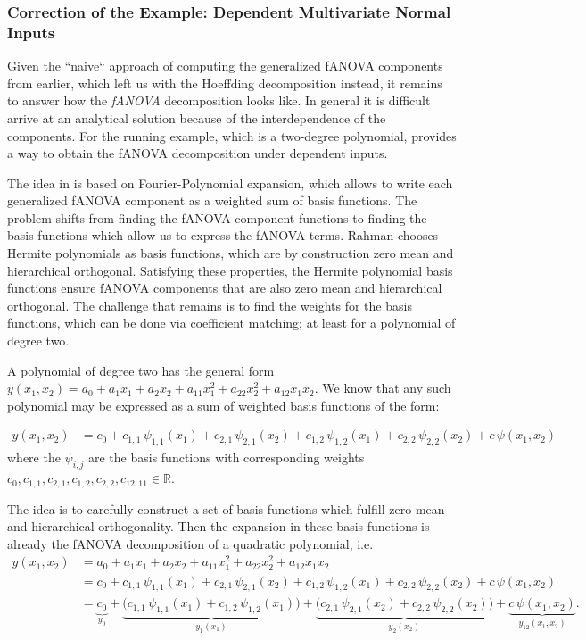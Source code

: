 \subsubsection{Correction of the Example: Dependent Multivariate Normal Inputs}
Given the ``naive`` approach of computing the generalized fANOVA components from earlier, which left us with the Hoeffding decomposition instead, it remains to answer how the \textit{fANOVA} decomposition looks like.
In general it is difficult arrive at an analytical solution because of the interdependence of the components. For the running example, which is a two-degree polynomial, \cite{rahman2014} provides a way to obtain the fANOVA decomposition under dependent inputs.\par

The idea in \cite{rahman2014} is based on Fourier-Polynomial expansion, which allows to write each generalized fANOVA component as a weighted sum of basis functions. 
The problem shifts from finding the fANOVA component functions to finding the basis functions which allow us to express the fANOVA terms.
Rahman chooses Hermite polynomials as basis functions, which are by construction zero mean and hierarchical orthogonal. Satisfying these properties, the Hermite polynomial basis functions ensure fANOVA components that are also zero mean and hierarchical orthogonal.
The challenge that remains is to find the weights for the basis functions, which can be done via coefficient matching; at least for a polynomial of degree two.

A polynomial of degree two has the general form $y(x_1,x_2) = a_0 + a_1 x_1 + a_2 x_2 + a_{11} x_1^2 + a_{22} x_2^2 + a_{12} x_1 x_2$.
We know that any such polynomial may be expressed as a sum of weighted basis functions \cite{nagler2024linalg} of the form:

\begin{align*}
y(x_1,x_2) 
&= c_0 
  + c_{1,1}\,\psi_{1,1}(x_1) 
  + c_{2,1}\,\psi_{2,1}(x_2)
  + c_{1,2}\,\psi_{1,2}(x_1)
  + c_{2,2}\,\psi_{2,2}(x_2)
  + c\,\psi(x_1,x_2)
\end{align*}
where the $\psi_{i,j}$ are the basis functions with corresponding weights $c_0, c_{1,1}, c_{2,1}, c_{1,2}, c_{2,2}, c_{12, 11} \in \mathbb{R}$.

The idea is to carefully construct a set of basis functions which fulfill zero mean 
and hierarchical orthogonality. Then the expansion in these basis functions is already the 
fANOVA decomposition of a quadratic polynomial, i.e.
\begin{align*}
y(x_1,x_2) 
&= a_0 + a_1 x_1 + a_2 x_2 + a_{11} x_1^2 + a_{22} x_2^2 + a_{12} x_1 x_2 \\[3pt]
&= c_0 
  + c_{1,1}\,\psi_{1,1}(x_1) 
  + c_{2,1}\,\psi_{2,1}(x_2)
  + c_{1,2}\,\psi_{1,2}(x_1)
  + c_{2,2}\,\psi_{2,2}(x_2)
  + c\,\psi(x_1,x_2) \\[3pt]
&= 
\underbrace{c_0}_{y_0}
+ \underbrace{\big(c_{1,1}\,\psi_{1,1}(x_1) 
                + c_{1,2}\,\psi_{1,2}(x_1)\big)}_{y_1(x_1)}
+ \underbrace{\big(c_{2,1}\,\psi_{2,1}(x_2) 
                + c_{2,2}\,\psi_{2,2}(x_2)\big)}_{y_2(x_2)}
+ \underbrace{c\,\psi(x_1,x_2)}_{y_{12}(x_1,x_2)}.
\end{align*}


